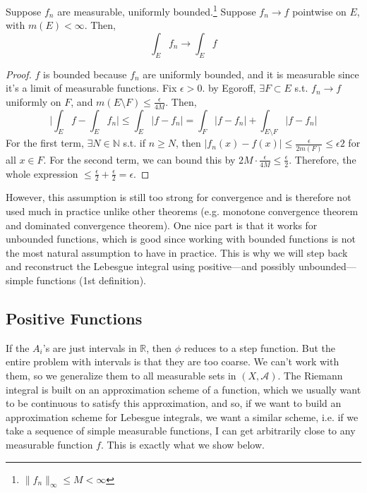   \begin{theorem}
    Suppose $f_n$ are measurable, uniformly bounded.\footnote{$\|f_n\|_\infty \leq M < \infty$} Suppose $f_n \to f$ pointwise on $E$, with $m(E) < \infty$. Then, 
    \begin{equation}
      \int_E f_n \to \int_E f
    \end{equation}
  \end{theorem}
  \begin{proof}
    $f$ is bounded because $f_n$ are uniformly bounded, and it is measurable since it's a limit of measurable functions. Fix $\epsilon > 0$. by Egoroff, $\exists F \subset E$ s.t. $f_n \to f$ uniformly on $F$, and $m(E \setminus F) \leq \frac{\epsilon}{4M}$. Then, 
    \begin{equation}
      \bigg| \int_E f - \int_E f_n \bigg| \leq \int_E |f - f_n| = \int_F |f - f_n| + \int_{E \setminus F} |f - f_n| 
    \end{equation}
    For the first term, $\exists N \in \mathbb{N}$ s.t. if $n \geq N$, then $|f_n (x) - f(x)| \leq \frac{\epsilon}{2 m(F)} \leq \epsilon{2}$ for all $x \in F$. For the second term, we can bound this by $2M \cdot \frac{\epsilon}{4M} \leq \frac{\epsilon}{2}$. Therefore, the whole expression $\leq \frac{\epsilon}{2} + \frac{\epsilon}{2} = \epsilon$. 
  \end{proof}

  However, this assumption is still too strong for convergence and is therefore not used much in practice unlike other theorems (e.g. monotone convergence theorem and dominated convergence theorem). One nice part is that it works for unbounded functions, which is good since working with bounded functions is not the most natural assumption to have in practice. This is why we will step back and reconstruct the Lebesgue integral using positive---and possibly unbounded---simple functions (1st definition). 

\subsection{Positive Functions}

  If the $A_i$'s are just intervals in $\mathbb{R}$, then $\phi$ reduces to a step function. But the entire problem with intervals is that they are too coarse. We can't work with them, so we generalize them to all measurable sets in $(X, \mathcal{A})$. The Riemann integral is built on an approximation scheme of a function, which we usually want to be continuous to satisfy this approximation, and so, if we want to build an approximation scheme for Lebesgue integrals, we want a similar scheme, i.e. if we take a sequence of simple measurable functions, I can get arbitrarily close to any measurable function $f$. This is exactly what we show below. 

